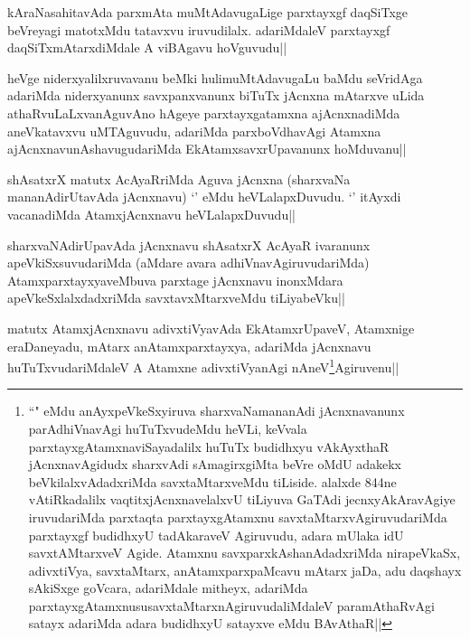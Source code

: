\begin{artha}
kAraNasahitavAda parxmAta  muMtAdavugaLige parxtayxgf daqSiTxge beVreyagi matotxMdu tatavxvu iruvudilalx. adariMdaleV parxtayxgf daqSiTxmAtarxdiMdale A viBAgavu hoVguvudu||
\end{artha}


\begin{artha}
heVge niderxyalilxruvavanu beMki hulimuMtAdavugaLu baMdu seVridAga adariMda niderxyanunx savxpanxvanunx biTuTx jAcnxna mAtarxve uLida athaRvuLaLxvanAguvAno hAgeye parxtayxgatamxna ajAcnxnadiMda aneVkatavxvu uMTAguvudu, adariMda parxboVdhavAgi Atamxna ajAcnxnavunAshavugudariMda EkAtamxsavxrUpavanunx hoMduvanu||
\end{artha}


\begin{artha}
shAsatxrX matutx AcAyaRriMda Aguva jAcnxna (sharxvaNa mananAdirUtavAda jAcnxnavu) `\stext' eMdu heVLalapxDuvudu. `\stext' itAyxdi vacanadiMda AtamxjAcnxnavu heVLalapxDuvudu||
\end{artha}



\begin{artha}
sharxvaNAdirUpavAda jAcnxnavu shAsatxrX AcAyaR ivaranunx apeVkiSxsuvudariMda (aMdare avara adhiVnavAgiruvudariMda) AtamxparxtayxyaveMbuva parxtage jAcnxnavu inonxMdara apeVkeSxlalxdadxriMda savxtavxMtarxveMdu tiLiyabeVku||
\end{artha}

\begin{artha}
matutx AtamxjAcnxnavu adivxtiVyavAda EkAtamxrUpaveV, Atamxnige eraDaneyadu, mAtarx anAtamxparxtayxya, adariMda jAcnxnavu huTuTxvudariMdaleV A Atamxne adivxtiVyanAgi nAneV\footnote{``\stext" eMdu anAyxpeVkeSxyiruva sharxvaNamananAdi jAcnxnavanunx parAdhiVnavAgi huTuTxvudeMdu heVLi, keVvala parxtayxgAtamxnaviSayadalilx huTuTx  budidhxyu vAkAyxthaR jAcnxnavAgidudx sharxvAdi sAmagirxgiMta beVre oMdU adakekx beVkilalxvAdadxriMda savxtaMtarxveMdu tiLiside. alalxde 844ne vAtiRkadalilx vaqtitxjAcnxnavelalxvU tiLiyuva GaTAdi jecnxyAkAravAgiye iruvudariMda parxtaqta parxtayxgAtamxnu savxtaMtarxvAgiruvudariMda parxtayxgf budidhxyU tadAkaraveV Agiruvudu, adara mUlaka idU savxtAMtarxveV Agide. Atamxnu savxparxkAshanAdadxriMda nirapeVkaSx, adivxtiVya, savxtaMtarx, anAtamxparxpaMcavu mAtarx jaDa, adu daqshayx sAkiSxge goVcara, adariMdale mitheyx, adariMda parxtayxgAtamxnususavxtaMtarxnAgiruvudaliMdaleV paramAthaRvAgi satayx adariMda adara budidhxyU satayxve eMdu BAvAthaR||}Agiruvenu||
\end{artha}

